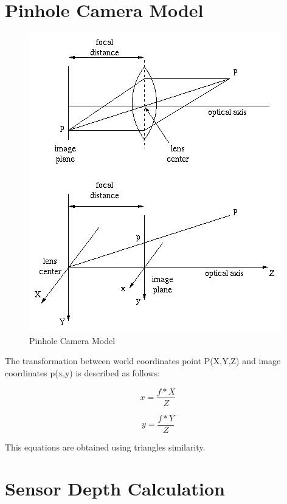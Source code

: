 
\section{Pinhole Camera Model}

\begin{figure}[h!]
\begin{center}
\includegraphics[scale=1]{images/pinhole}
\caption{Pinhole Camera Model}
\label{fig:pinhole}
\end{center}
\end{figure}


The transformation between world coordinates point P(X,Y,Z) and image coordinates p(x,y) is described as 
follows:

\begin{equation}
\label{eq:disparity2}
 x = \frac{f*X}{Z}
\end{equation}

\begin{equation}
\label{eq:disparity2}
 y = \frac{f*Y}{Z}
\end{equation}

This equations are  obtained using triangles similarity.

\section{Sensor Depth Calculation}

